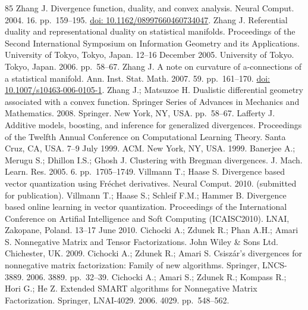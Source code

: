 \begin{thebibliography}{85}
\hypertarget{B22-entropy-12-01532}{} Zhang J. Divergence function, duality, and convex analysis. Neural Comput. 2004. 16. pp.~159--195. \href{https://doi.org/10.1162/08997660460734047}{doi: 10.1162/08997660460734047}.
\hypertarget{B23-entropy-12-01532}{} Zhang J. Referential duality and representational duality on statistical manifolds. Proceedings of the Second International Symposium on Information Geometry and its Applications. University of Tokyo, Tokyo, Japan. 12–16 December 2005. University of Tokyo. Tokyo, Japan. 2006. pp.~58--67.
\hypertarget{B24-entropy-12-01532}{} Zhang J. A note on curvature of a-connections of a statistical manifold. Ann. Inst. Stat. Math. 2007. 59. pp.~161--170. \href{https://doi.org/10.1007/s10463-006-0105-1}{doi: 10.1007/s10463-006-0105-1}.
\hypertarget{B25-entropy-12-01532}{} Zhang J.; Matsuzoe H. Dualistic differential geometry associated with a convex function. Springer Series of Advances in Mechanics and Mathematics. 2008. Springer. New York, NY, USA. pp.~58--67.
\hypertarget{B26-entropy-12-01532}{} Lafferty J. Additive models, boosting, and inference for generalized divergences. Proceedings of the Twelfth Annual Conference on Computational Learning Theory. Santa Cruz, CA, USA. 7–9 July 1999. ACM. New York, NY, USA. 1999.
\hypertarget{B27-entropy-12-01532}{} Banerjee A.; Merugu S.; Dhillon I.S.; Ghosh J. Clustering with Bregman divergences. J. Mach. Learn. Res. 2005. 6. pp.~1705--1749.
\hypertarget{B28-entropy-12-01532}{} Villmann T.; Haase S. Divergence based vector quantization using Fréchet derivatives. Neural Comput. 2010. (submitted for publication).
\hypertarget{B29-entropy-12-01532}{} Villmann T.; Haase S.; Schleif F.M.; Hammer B. Divergence based online learning in vector quantization. Proceedings of the International Conference on Artifial Intelligence and Soft Computing (ICAISC2010). LNAI, Zakopane, Poland. 13–17 June 2010.
\hypertarget{B30-entropy-12-01532}{} Cichocki A.; Zdunek R.; Phan A.H.; Amari S. Nonnegative Matrix and Tensor Factorizations. John Wiley \& Sons Ltd. Chichester, UK. 2009.
\hypertarget{B31-entropy-12-01532}{} Cichocki A.; Zdunek R.; Amari S. Csiszár’s divergences for nonnegative matrix factorization: Family of new algorithms. Springer, LNCS-3889. 2006. 3889. pp.~32--39.
\hypertarget{B32-entropy-12-01532}{} Cichocki A.; Amari S.; Zdunek R.; Kompass R.; Hori G.; He Z. Extended SMART algorithms for Nonnegative Matrix Factorization. Springer, LNAI-4029. 2006. 4029. pp.~548--562.

\end{thebibliography}
